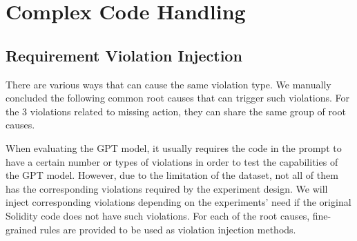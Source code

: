 \section{Complex Code Handling}

\subsection{Requirement Violation Injection}
There are various ways that can cause the same violation type.
We manually concluded the following common root causes that can trigger such violations. 
For the 3 violations related to missing action, they can share the same group of root causes.

When evaluating the GPT model, it usually requires the code in the prompt to have a certain number or types of violations in order to test the capabilities of the GPT model.
However, due to the limitation of the dataset, not all of them has the corresponding violations required by the experiment design.
We will inject corresponding violations depending on the experiments' need if the original Solidity code does not have such violations.
For each of the root causes, fine-grained rules are provided to be used as violation injection methods.


